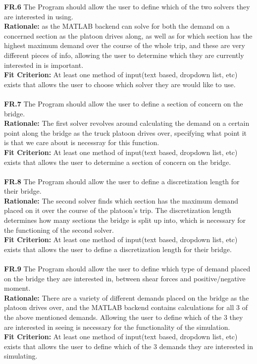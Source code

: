 \documentclass[12pt]{article}
\begin{document}
  \textbf{FR.6} The Program should allow the user to define which of the two solvers they are interested in using.\\
  \textbf{Rationale:} as the MATLAB backend can solve for both the demand on a concerned section as the platoon drives along, as well as for which section has the 
  highest maximum demand over the course of the whole trip, and these are very different pieces of info, allowing the user to determine which they are currently interested in 
  is important.\\
  \textbf{Fit Criterion:} At least one method of input(text based, dropdown list, etc) exists that allows the user to choose which solver they are would like to use.\\\\

  \textbf{FR.7} The Program should allow the user to define a section of concern on the bridge.\\
  \textbf{Rationale:} The first solver revolves around calculating the demand on a certain point along the bridge as the truck platoon drives over, specifying what point it is
  that we care about is necessray for this function.\\
  \textbf{Fit Criterion:} At least one method of input(text based, dropdown list, etc) exists that allows the user to determine a section of concern on the bridge.\\\\

  \textbf{FR.8} The Program should allow the user to define a discretization length for their bridge.\\
  \textbf{Rationale:} The second solver finds which section has the maximum demand placed on it over the course of the platoon's trip. The discretization length determines how
  many sections the bridge is split up into, which is necessary for the functioning of the second solver.\\
  \textbf{Fit Criterion:} At least one method of input(text based, dropdown list, etc) exists that allows the user to define a discretization length for their bridge.\\\\

  \textbf{FR.9} The Program should allow the user to define which type of demand placed on the bridge they are interested in, between shear forces and positive/negative moment.\\
  \textbf{Rationale:} There are a variety of different demands placed on the bridge as the platoon drives over, and the MATLAB backend contains calculations for all 3 of the
  above mentioned demands. Allowing the user to define which of the 3 they are interested in seeing is necessary for the functionality of the simulation.\\
  \textbf{Fit Criterion:} At least one method of input(text based, dropdown list, etc) exists that allows the user to define which of the 3 demands they are interested in
  simulating.\\\\
\end{document}

